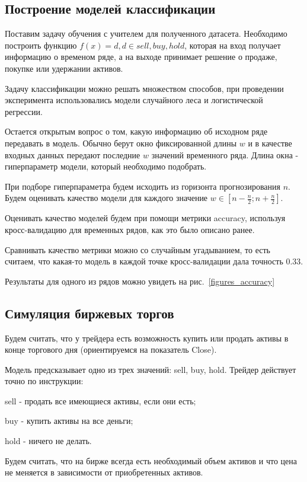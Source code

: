 \documentclass[a4paper,article,14pt]{extarticle}
\begin{document}
\subsection{Построение моделей классификации}

Поставим задачу обучения с учителем для полученного датасета.
Необходимо построить функцию $f(x)=d, d \in {sell, buy, hold}$, которая на вход получает информацию о временом ряде, а на выходе принимает решение о продаже, покупке или удержании активов.

Задачу классификации можно решать множеством способов, при проведении эксперимента использовались модели случайного леса и логистической регрессии.

Остается открытым вопрос о том, какую информацию об исходном ряде передавать в модель.
Обычно берут окно фиксированной длины $w$ и в качестве входных данных передают последние $w$ значений временного ряда.
Длина окна - гиперпараметр модели, который необходимо подобрать.

При подборе гиперпараметра будем исходить из горизонта прогнозирования $n$.
Будем оценивать качество модели для каждого значение $w \in [n - \frac{n}{2}; n + \frac{n}{2}]$.

Оценивать качество моделей будем при помощи метрики accuracy, используя кросс-валидацию для временных рядов, как это было описано ранее.

Сравнивать качество метрики можно со случайным угадыванием, то есть считаем, что какая-то модель в каждой точке кросс-валидации дала точность 0.33.

Результаты для одного из рядов можно увидеть на рис.~\ref{figures_accuracy}


\subsection{Симуляция биржевых торгов}

Будем считать, что у трейдера есть возможность купить или продать активы в конце торгового дня (ориентируемся на показатель Close).

Модель предсказывает одно из трех значений: sell, buy, hold.
Трейдер действует точно по инструкции:

sell - продать все имеющиеся активы, если они есть;

buy - купить активы на все деньги;

hold - ничего не делать.

Будем считать, что на бирже всегда есть необходимый объем активов и что цена не меняется в зависимости от приобретенных активов.
\end{document}
